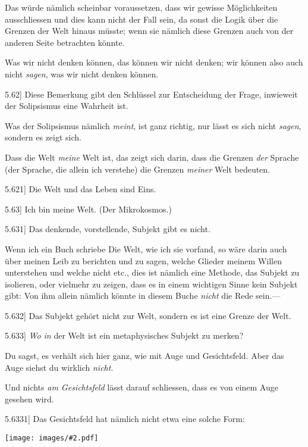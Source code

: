 \documentclass[12pt,oneside]{book}[2007/10/19]
\newcommand{\PropERef}[1]{\hyperref[PropE:#1]{#1}}
\newcommand{\PropositionG}[2]{%
  \item[\phantomsection\label{PropG:#1}\PropERef{#1}] #2%
}
\newcommand{\Illustration}[2][0.3\textwidth]{%
  \begin{center}
  \texttt{[image: images/\#2.pdf]}
  \end{center}
}
\newcommand{\DPtypo}[2]{#2}
\newcommand{\Emph}[1]{\emph{#1}}%
\begin{document}
\begin{propositions}
{Das würde nämlich scheinbar voraussetzen, dass
\enlargethispage{9pt} %
wir gewisse Möglichkeiten ausschliessen und dies
kann nicht der Fall sein, da sonst die Logik
über die Grenzen der Welt hinaus müsste; wenn
sie nämlich diese Grenzen auch von der anderen
Seite betrachten könnte.

Was wir nicht denken können, das können wir
nicht denken; wir können also auch nicht \Emph{sagen},
was wir nicht denken können.}


\PropositionG{5.62}
{Diese Bemerkung gibt den Schlüssel zur
Entscheidung der Frage, inwieweit der Solipsismus
eine Wahrheit ist.

Was der Solipsismus nämlich \Emph{meint}, ist ganz
richtig, nur lässt es sich nicht \Emph{sagen}, sondern es
zeigt sich.

Dass die Welt \Emph{meine} Welt ist, das zeigt sich darin,
dass die Grenzen \Emph{der} Sprache (der Sprache, die allein
ich verstehe) die Grenzen \Emph{meiner} Welt bedeuten.}


\PropositionG{5.621}
{Die Welt und das Leben sind Eins.}


\PropositionG{5.63}
{Ich bin meine Welt. (Der Mikrokosmos.)}


\PropositionG{5.631}
{Das denkende, vorstellende, Subjekt gibt es nicht.

Wenn ich ein Buch schriebe \glqq{}Die Welt, wie ich
sie vorfand\grqq{}, so wäre darin auch über meinen Leib
zu berichten und zu sagen, welche Glieder meinem
Willen unterstehen und welche nicht etc., dies ist
nämlich eine Methode, das Subjekt zu isolieren,
oder vielmehr zu zeigen, dass es in einem wichtigen
Sinne kein Subjekt gibt: Von ihm allein nämlich
könnte in diesem Buche \Emph{nicht} die Rede sein.---}


\PropositionG{5.632}
{Das Subjekt gehört nicht zur Welt, sondern es
ist eine Grenze der Welt.}


\PropositionG{5.633}
{\Emph{Wo in} der Welt ist ein \DPtypo{methaphysisches}{metaphysisches} Subjekt
zu merken?

Du sagst, es verhält sich hier ganz, wie mit Auge
und Gesichtsfeld. Aber das Auge siehst du wirklich
\Emph{nicht}.

Und nichts \Emph{am Gesichtsfeld} lässt darauf
schliessen, dass es von einem Auge gesehen wird.}


\PropositionG{5.6331}
{Das Gesichtsfeld hat nämlich nicht etwa eine
solche Form:
\Illustration{sight-de}
}



\end{propositions}
\end{document}
